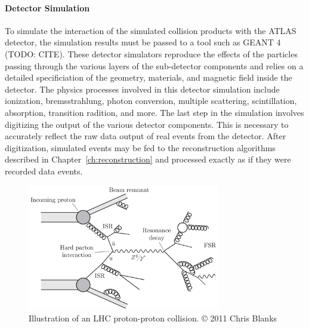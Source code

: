 \paragraph{\textbf{Detector Simulation}}
To simulate the interaction of the simulated collision products with the ATLAS detector, the simulation results must be passed to a tool such as GEANT 4 (TODO: CITE).
These detector simulators reproduce the effects of the particles passing through the various layers of the sub-detector components and relies on a detailed specificiation of the geometry, materials, and magnetic field inside the detector.
The physics processes involved in this detector simulation include ionization, bremsstrahlung, photon conversion, multiple scattering, scintillation, absorption, transition radition, and more.
The last step in the simulation involves digitizing the output of the various detector components.
This is necessary to accurately reflect the raw data output of real events from the detector.
After digitization, simulated events may be fed to the reconstruction algorithms described in Chapter~\ref{ch:reconstruction} and processed exactly as if they were recorded data events.

\begin{figure}
	\centering
	\includegraphics[width=0.75\textwidth]{pp_interaction}
	\caption{Illustration of an LHC proton-proton collision. © 2011 Chris Blanks}
	\label{fig:pp_interaction}
\end{figure}